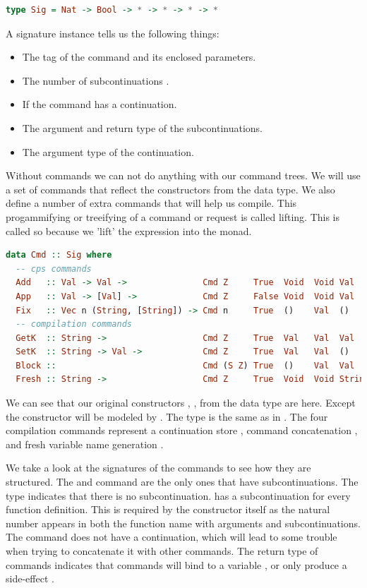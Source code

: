 \begin{lstlisting}[language=Haskell]
type Sig = Nat -> Bool -> * -> * -> * -> *
\end{lstlisting}

A signature instance  tells us the following things:

\begin{itemize}
\item The tag of the command and its enclosed parameters.
\item The number of subcontinuations .
\item If the command has a continuation.
\item The argument  and return type  of the subcontinuations.
\item The argument type  of the continuation.
\end{itemize}

Without commands we can not do anything with our command trees. We will use a set of commands that reflect the constructors from the  data type. We also define a number of extra commands that will help us compile. This progammifying or treeifying of a command or request is called lifting. This is called so because we 'lift' the expression into the monad.

\begin{lstlisting}[language=Haskell]
data Cmd :: Sig where
  -- cps commands
  Add   :: Val -> Val ->               Cmd Z     True  Void  Void Val
  App   :: Val -> [Val] ->             Cmd Z     False Void  Void Val
  Fix   :: Vec n (String, [String]) -> Cmd n     True  ()    Val  ()
  -- compilation commands
  GetK  :: String ->                   Cmd Z     True  Val   Val  Val
  SetK  :: String -> Val ->            Cmd Z     True  Val   Val  ()
  Block ::                             Cmd (S Z) True  ()    Val  Val
  Fresh :: String ->                   Cmd Z     True  Void  Void String
\end{lstlisting}

We can see that our original constructors , ,  from the  data type are here. Except the  constructor will be modeled by . The  type is the same as in . The four compilation commands represent a continuation store , command concatenation , and fresh variable name generation .

We take a look at the signatures of the commands to see how they are structured. The  and  command are the only ones that have subcontinuations. The  type indicates that there is no subcontinuation.  has a subcontinuation for every function definition. This is required by the constructor itself as the natural number  appears in both the function name with arguments and subcontinuations. The  command does not have a continuation, which will lead to some trouble when trying to concatenate it with other commands. The return type of commands indicates that commands will bind to a variable , or only produce a side-effect \icode{()}.

